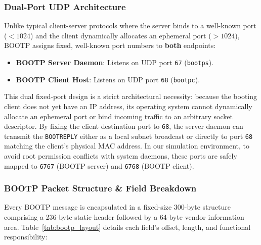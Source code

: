 \documentclass[12pt, a4paper]{article}
\begin{document}
\subsubsection{Dual-Port UDP Architecture}
Unlike typical client-server protocols where the server binds to a well-known port ($<1024$) and the client dynamically allocates an ephemeral port ($>1024$), BOOTP assigns fixed, well-known port numbers to \textbf{both} endpoints:
\begin{itemize}
    \item \textbf{BOOTP Server Daemon}: Listens on UDP port \texttt{67} (\texttt{bootps}).
    \item \textbf{BOOTP Client Host}: Listens on UDP port \texttt{68} (\texttt{bootpc}).
\end{itemize}
This dual fixed-port design is a strict architectural necessity: because the booting client does not yet have an IP address, its operating system cannot dynamically allocate an ephemeral port or bind incoming traffic to an arbitrary socket descriptor. By fixing the client destination port to \texttt{68}, the server daemon can transmit the \texttt{BOOTREPLY} either as a local subnet broadcast or directly to port \texttt{68} matching the client's physical MAC address. In our simulation environment, to avoid root permission conflicts with system daemons, these ports are safely mapped to \texttt{6767} (BOOTP server) and \texttt{6768} (BOOTP client).

\subsubsection{BOOTP Packet Structure \& Field Breakdown}
Every BOOTP message is encapsulated in a fixed-size 300-byte structure comprising a 236-byte static header followed by a 64-byte vendor information area. Table~\ref{tab:bootp_layout} details each field's offset, length, and functional responsibility:
\end{document}

